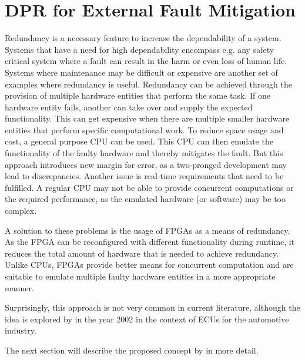 \section{\gls{DPR} for External Fault Mitigation}\label{ExternalFaults}
Redundancy is a necessary feature to increase the dependability of a system.
Systems that have a need for high dependability encompass e.g. any safety critical system where a fault can result in the harm or even loss of human life.
Systems where maintenance may be difficult or expensive are another set of examples where redundancy is useful.
Redundancy can be achieved through the provision of multiple hardware entities that perform the same task.
If one hardware entity fails, another can take over and supply the expected functionality.
This can get expensive when there are multiple smaller hardware entities that perform specific computational work. 
To reduce space usage and cost, a general purpose \gls{CPU} can be used.
This \gls{CPU} can then emulate the functionality of the faulty hardware and thereby mitigates the fault. 
But this approach introduces new margin for error, as a two-pronged development may lead to discrepancies.
Another issue is real-time requirements that need to be fulfilled.
A regular \gls{CPU} may not be able to provide concurrent computations or the required performance, as the emulated hardware (or software) may be too complex.

A solution to these problems is the usage of \glspl{FPGA} as a means of redundancy. 
As the \gls{FPGA} can be reconfigured with different functionality during runtime, it reduces the total amount of hardware that is needed to achieve redundancy.
Unlike \glspl{CPU}, \glspl{FPGA} provide better means for concurrent computation and are suitable to emulate multiple faulty hardware entities in a more appropriate manner. %

Surprisingly, this approach is not very common in current literature, although the idea is explored by \cite{crdl_fail-safe_2002} in the year 2002 in the context of \glspl{ECU} for the automotive industry.

The next section will describe the proposed concept by \cite{crdl_fail-safe_2002} in more detail.

